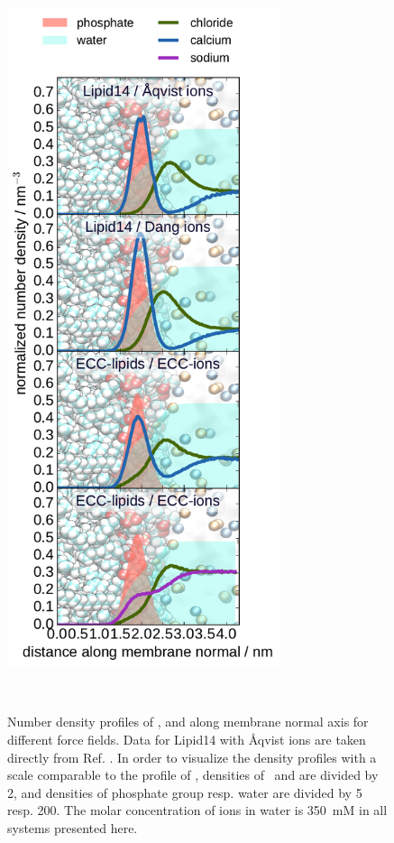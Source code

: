 \documentclass[aip,jcp,twocolumn]{revtex4}
\begin{document}
\begin{figure}[tbp]
  \centering
  \includegraphics[width=8.0cm]{../Fig/ipython_nb/density_profiles_ca_cl_wat_phos_models-compar.pdf}
  \caption{\label{fig:cacl-dens}
    Number density profiles of ,  and  along membrane normal axis
    for different force fields. Data for Lipid14 with \AA{}qvist ions are taken directly from Ref. .
    In order to visualize the density profiles with a scale comparable to the profile of , 
    densities of~ and  are divided by 2, and
    densities of phosphate group resp. water are divided by 5 resp. 200. 
    The molar concentration of ions in water is 350~mM in all systems
    presented here. 
    }
   \\
\end{figure}
\end{document}
